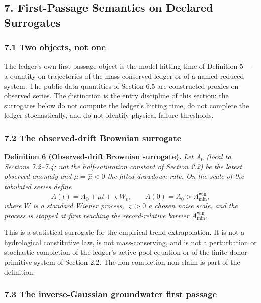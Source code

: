 \documentclass[11pt]{article}
\begin{document}
\subsection{7. First-Passage Semantics on Declared
Surrogates}\label{first-passage-semantics-on-declared-surrogates}

\subsubsection{7.1 Two objects, not one}\label{two-objects-not-one}

The ledger's own first-passage object is the model hitting time of
Definition 5 --- a quantity on trajectories of the mass-conserved ledger
or of a named reduced system. The public-data quantities of Section 6.5
are constructed proxies on observed series. The distinction is the entry
discipline of this section: the surrogates below do not compute the
ledger's hitting time, do not complete the ledger stochastically, and do
not identify physical failure thresholds.

\subsubsection{7.2 The observed-drift Brownian
surrogate}\label{the-observed-drift-brownian-surrogate}

\textbf{Definition 6 (Observed-drift Brownian surrogate).} \emph{Let
\(A_0\) (local to Sections 7.2--7.4; not the half-saturation constant of
Section 2.2) be the latest observed anomaly and
\(\mu = \widehat\mu < 0\) the fitted drawdown rate. On the scale of the
tabulated series define}
\[A(t) = A_0 + \mu t + \varsigma W_t, \qquad A(0) = A_0 > A_{\min}^{\mathrm{win}},\]
\emph{where \(W\) is a standard Wiener process, \(\varsigma > 0\) a
chosen noise scale, and the process is stopped at first reaching the
record-relative barrier \(A_{\min}^{\mathrm{win}}\).}

This is a statistical surrogate for the empirical trend extrapolation.
It is not a hydrological constitutive law, is not mass-conserving, and
is not a perturbation or stochastic completion of the ledger's
active-pool equation or of the finite-donor primitive system of Section
2.2. The non-completion non-claim is part of the definition.

\subsubsection{7.3 The inverse-Gaussian groundwater first
passage}\label{the-inverse-gaussian-groundwater-first-passage}
\end{document}

